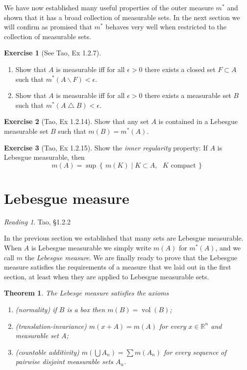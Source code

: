 \documentclass[10pt,oneside]{amsbook}
\newcommand{\set}[1]{\left\{\,#1\,\right\}}
\renewcommand{\setminus}{\smallsetminus}
\renewcommand{\triangle}{\bigtriangleup}
\newcommand{\RR}{{\mathbb R}}
\DeclareMathOperator{\vol}{vol}
\theoremstyle{definition}
\newtheorem{exerc}{Exercise}[section]
\theoremstyle{plain}
\newtheorem{thm}{Theorem}[section]
\theoremstyle{definition}
\theoremstyle{remark}
\newtheorem*{reading}{Reading}
\numberwithin{equation}{section}
\numberwithin{figure}{section}
\begin{document}
We have now established many useful properties of the outer measure $m^*$ and shown that it has a broad collection of measurable sets. In the next section we will confirm as promised that $m^*$ behaves very well when restricted to the collection of measurable sets.

\begin{exerc}[See Tao, Ex 1.2.7]
  \begin{enumerate}
    \item Show that $A$ is measurable iff for all $\epsilon>0$ there exists a closed set $F\subset A$ such that $m^*(A\setminus F)<\epsilon$.
    \item Show that $A$ is measurable iff for all $\epsilon>0$ there exists a measurable set $B$ such that $m^*(A\triangle B)<\epsilon$.
  \end{enumerate}
\end{exerc}

\begin{exerc}[Tao, Ex 1.2.14]
  Show that any set $A$ is contained in a Lebesgue measurable set $B$ such that $m(B)=m^*(A)$.
\end{exerc}

\begin{exerc}[Tao, Ex 1.2.15]
  Show the \emph{inner regularity} property: If $A$ is Lebesgue measurable, then
  \[m(A)=\sup\set{m(K)\mid K\subset A,\text{ $K$ compact}}
  \]
\end{exerc}

\newpage
\section{Lebesgue measure}

\begin{reading}
  Tao, \S 1.2.2
\end{reading}

In the previous section we established that many sets are Lebesgue measurable. When $A$ is Lebesgue measurable we simply write $m(A)$ for $m^*(A)$, and we call $m$ the \emph{Lebesgue measure}. We are finally ready to prove that the Lebesgue measure satisfies the requirements of a measure that we laid out in the first section, at least when they are applied to Lebesgue measurable sets.

\begin{thm}
  The Lebesge measure satisfies the axioms
  \begin{enumerate}
  \item (normality) if $B$ is a box then $m(B)=\vol(B)$;
  \item (translation-invariance) $m(x+A)=m(A)$ for every $x\in\RR^n$ and measurable set $A$;
  \item (countable additivity) $m(\bigcup A_n)=\sum m(A_n)$ for every sequence of pairwise disjoint measurable sets $A_n$.
  \end{enumerate}
\end{thm}
\end{document}
